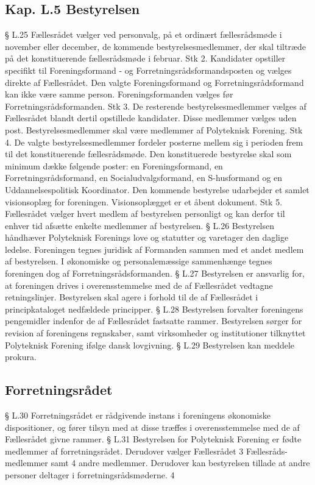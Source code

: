 \begin{list}
\subsection{Kap. L.5 Bestyrelsen}
\label{kap:bestyrelsen}
§ L.25
Fællesrådet vælger ved personvalg, på et ordinært fællesrådsmøde i november eller december, de kommende
bestyrelsesmedlemmer, der skal tiltræde på det konstituerende fællesrådsmøde i februar.
Stk 2. Kandidater opstiller specifikt til Foreningsformand - og Forretningsrådsformandsposten og vælges
direkte af Fællesrådet. Den valgte Foreningsformand og Forretningsrådsformand kan ikke være samme
person. Foreningsformanden vælges før Forretningsrådsformanden.
Stk 3. De resterende bestyrelsesmedlemmer vælges af Fællesrådet blandt dertil opstillede kandidater. Disse
medlemmer vælges uden post. Bestyrelsesmedlemmer skal være medlemmer af Polyteknisk Forening.
Stk 4. De valgte bestyrelsesmedlemmer fordeler posterne mellem sig i perioden frem til det konstituerende
fællesrådsmøde. Den konstituerede bestyrelse skal som minimum dække følgende poster: en
Foreningsformand, en Forretningsrådsformand, en Socialudvalgsformand, en S-husformand og en
Uddannelsespolitisk Koordinator. Den kommende bestyrelse udarbejder et samlet visionsoplæg for
foreningen. Visionsoplægget er et åbent dokument.
Stk 5. Fællesrådet vælger hvert medlem af bestyrelsen personligt og kan derfor til enhver tid afsætte enkelte
medlemmer af bestyrelsen.
§ L.26 Bestyrelsen håndhæver Polyteknisk Forenings love og statutter og varetager den daglige ledelse. Foreningen
         tegnes juridisk af Formanden sammen med et andet medlem af bestyrelsen. I økonomiske og
         personalemæssige sammenhænge tegnes foreningen dog af Forretningsrådsformanden.
§ L.27 Bestyrelsen er ansvarlig for, at foreningen drives i overensstemmelse med de af Fællesrådet vedtagne
         retningslinjer. Bestyrelsen skal agere i forhold til de af Fællesrådet i principkataloget nedfældede principper.
§ L.28 Bestyrelsen forvalter foreningens pengemidler indenfor de af Fællesrådet fastsatte rammer. Bestyrelsen sørger for revision af foreningens regnskaber, samt virksomheder og institutioner tilknyttet Polyteknisk Forening ifølge dansk lovgivning.
§ L.29 Bestyrelsen kan meddele prokura.
\subsection{Forretningsrådet}
§ L.30 Forretningsrådet er rådgivende instans i foreningens økonomiske dispositioner, og fører tilsyn med at disse
           træffes i overensstemmelse med de af Fællesrådet givne rammer.
§ L.31 Bestyrelsen for Polyteknisk Forening er fødte medlemmer af forretningsrådet. Derudover vælger Fællesrådet
            3 Fællesråds-medlemmer samt 4 andre medlemmer. Derudover kan bestyrelsen tillade at andre personer
             deltager i forretningsrådsmøderne.
4

\end{list}
